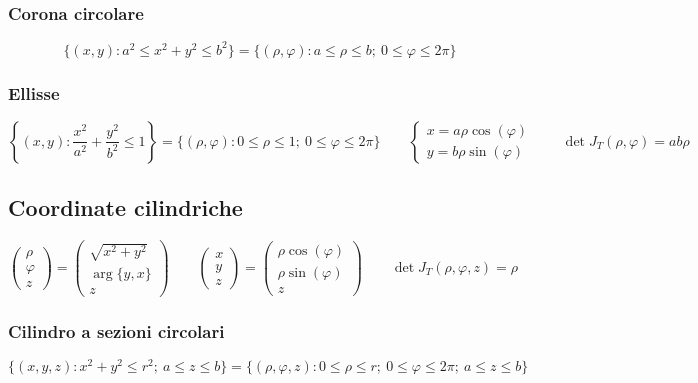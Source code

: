 \documentclass[]{article}
\newcommand{\xy}{(x,y):}
\newcommand{\rp}{(\rho,\varphi):}
\newcommand{\xyz}{(x,y,z):}
\newcommand{\rpz}{(\rho,\varphi,z):}
\begin{document}
\subsubsection{Corona circolare}
\[
\{\xy a^2 \le x^2+y^2 \le b^2 \}=\{\rp a \le\rho\le b; \ 0 \le\varphi\le 2\pi \}
\]

\subsubsection{Ellisse}
\[
\left\{\xy \frac{x^2}{a^2}+\frac{y^2}{b^2}\le 1 \right\}=\{\rp 0 \le\rho\le 1; \ 0 \le\varphi\le 2\pi \} \qquad
\left\{\begin{array}{l}
x=a\rho\cos(\varphi) \\
y=b\rho\sin(\varphi)
\end{array}\right. \qquad
\det J_T(\rho,\varphi)=a b \rho
\]

\subsection{Coordinate cilindriche}
\[\left(\begin{array}{c}
\rho \\ \varphi \\ z
\end{array}\right)=\left(\begin{array}{c}
\sqrt{x^2+y^2} \\ \arg\{y,x\} \\ z
\end{array}\right) \qquad
\left(\begin{array}{c}
x \\ y \\ z
\end{array}\right)=\left(\begin{array}{c}
\rho\cos(\varphi) \\ \rho\sin(\varphi) \\ z
\end{array}\right) \qquad
\det J_T(\rho,\varphi,z)=\rho
\]

\subsubsection{Cilindro a sezioni circolari}
\[
\{\xyz x^2+y^2 \le r^2; \ a \le z \le b \}=\{\rpz 0 \le\rho\le r; \ 0 \le\varphi\le 2\pi ; \ a \le z \le b \}
\]
\end{document}
